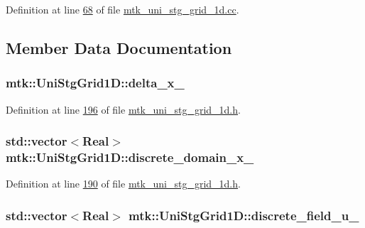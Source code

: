 Definition at line \hyperlink{mtk__uni__stg__grid__1d_8cc_source_l00068}{68} of file \hyperlink{mtk__uni__stg__grid__1d_8cc_source}{mtk\-\_\-uni\-\_\-stg\-\_\-grid\-\_\-1d.\-cc}.



\subsection{Member Data Documentation}
\hypertarget{classmtk_1_1UniStgGrid1D_a12577bbe0b88e9a0ac9b2267f2fcc48c}{
\subsubsection[{delta\-\_\-x\-\_\-}]{ mtk\-::\-Uni\-Stg\-Grid1\-D\-::delta\-\_\-x\-\_\-\hspace{0.3cm}{\ttfamily [private]}}}\label{classmtk_1_1UniStgGrid1D_a12577bbe0b88e9a0ac9b2267f2fcc48c}


Definition at line \hyperlink{mtk__uni__stg__grid__1d_8h_source_l00196}{196} of file \hyperlink{mtk__uni__stg__grid__1d_8h_source}{mtk\-\_\-uni\-\_\-stg\-\_\-grid\-\_\-1d.\-h}.

\hypertarget{classmtk_1_1UniStgGrid1D_a0a1f9c00e21659e05f414dd97e2a52e3}{
\subsubsection[{discrete\-\_\-domain\-\_\-x\-\_\-}]{\setlength{\rightskip}{0pt plus 5cm}std\-::vector$<${\bf Real}$>$ mtk\-::\-Uni\-Stg\-Grid1\-D\-::discrete\-\_\-domain\-\_\-x\-\_\-\hspace{0.3cm}{\ttfamily [private]}}}\label{classmtk_1_1UniStgGrid1D_a0a1f9c00e21659e05f414dd97e2a52e3}


Definition at line \hyperlink{mtk__uni__stg__grid__1d_8h_source_l00190}{190} of file \hyperlink{mtk__uni__stg__grid__1d_8h_source}{mtk\-\_\-uni\-\_\-stg\-\_\-grid\-\_\-1d.\-h}.

\hypertarget{classmtk_1_1UniStgGrid1D_a9a1e7c4ff7f83787a1844d8b24af8045}{
\subsubsection[{discrete\-\_\-field\-\_\-u\-\_\-}]{\setlength{\rightskip}{0pt plus 5cm}std\-::vector$<${\bf Real}$>$ mtk\-::\-Uni\-Stg\-Grid1\-D\-::discrete\-\_\-field\-\_\-u\-\_\-\hspace{0.3cm}{\ttfamily [private]}}}\label{classmtk_1_1UniStgGrid1D_a9a1e7c4ff7f83787a1844d8b24af8045}


